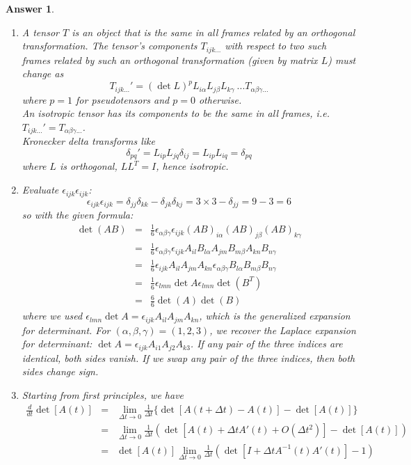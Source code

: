 \documentclass[a4paper]{article}
\newtheorem{ans}{Answer}[section]
\theoremstyle{new}
\begin{document}
\begin{ans}\leavevmode
\begin{enumerate}[label=(\roman*)]
\item A tensor $T$ is an object that is the same in all frames related by an orthogonal transformation. The tensor's components $T_{ijk...}$ with respect to two such frames related by such an orthogonal transformation (given by matrix $L$) must change as 
$$T_{ijk...}'=(\det L)^pL_{i\alpha}L_{j\beta}L_{k\gamma}~...T_{\alpha\beta\gamma...}$$
where $p=1$ for pseudotensors and $p=0$ otherwise.\\[5pt]
An isotropic tensor has its components to be the same in all frames, i.e. $T_{ijk...}'=T_{\alpha\beta\gamma...}$.\\[5pt]
Kronecker delta transforms like
$$\delta_{pq}'=L_{ip}L_{jq}\delta_{ij}=L_{ip}L_{iq}=\delta_{pq}$$
where $L$ is orthogonal, $LL^T=I$, hence isotropic.
\item 
Evaluate $\epsilon_{ijk}\epsilon_{ijk}$:
$$\epsilon_{ijk}\epsilon_{ijk}=\delta_{jj}\delta_{kk}-\delta_{jk}\delta_{kj}=3\times 3-\delta_{jj}=9-3=6$$
so with the given formula:
\begin{eqnarray}
\det(AB)&=&\frac{1}{6}\epsilon_{\alpha\beta\gamma}\epsilon_{ijk}(AB)_{i\alpha}(AB)_{j\beta}(AB)_{k\gamma}\nonumber\\&=&\frac{1}{6}\epsilon_{\alpha\beta\gamma}\epsilon_{ijk}A_{il}B_{l\alpha}A_{jm}B_{m\beta}A_{kn}B_{n\gamma}\nonumber\\&=&\frac{1}{6}\epsilon_{ijk}A_{il}A_{jm}A_{kn}\epsilon_{\alpha\beta\gamma}B_{l\alpha}B_{m\beta}B_{n\gamma}\nonumber\\&=&\frac{1}{6}\epsilon_{lmn}\det A\epsilon_{lmn}\det(B^T)\nonumber\\&=&\frac{6}{6}\det(A)\det(B)\nonumber
\end{eqnarray}
where we used $\epsilon_{lmn}\det A=\epsilon_{ijk}A_{il}A_{jm}A_{kn}$, which is the generalized expansion for determinant. For $(\alpha,\beta,\gamma)=(1,2,3)$, we recover the Laplace expansion for determinant: $\det A=\epsilon_{ijk}A_{i1}A_{j2}A_{k3}$. If any pair of the three indices are identical, both sides vanish. If we swap any pair of the three indices, then both sides change sign.
\item Starting from first principles, we have
\begin{eqnarray}
\frac{d}{dt}\det[A(t)]&=&\lim_{\Delta t\rightarrow 0}\frac{1}{\Delta t}\bigg\{\det[A(t+\Delta t)-A(t)]-\det[A(t)]\bigg\}\nonumber\\&=&\lim_{\Delta t\rightarrow 0}\frac{1}{\Delta t}(\det[A(t)+\Delta tA'(t)+O(\Delta t^2)]-\det[A(t)])\nonumber\\&=&\det[A(t)]\lim_{\Delta t\rightarrow 0}\frac{1}{\Delta t}(\det[I+\Delta tA^{-1}(t)A'(t)]-1)\nonumber

\end{eqnarray}
\end{enumerate}
\end{ans}
\end{document}
